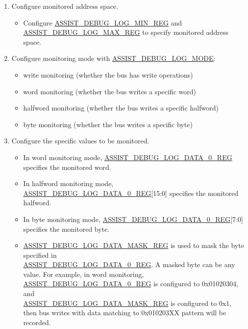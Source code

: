 \documentclass[main\_\_EN.tex]{subfiles}
\begin{document}
\begin{enumerate}

\item Configure monitored address space.
      \begin{itemize}
         \item Configure \hyperref[regdesc:ASSISTDEBUGLOGMINREG]{ASSIST\_DEBUG\_LOG\_MIN\_REG} and \hyperref[regdesc:ASSISTDEBUGLOGMAXREG]{ASSIST\_DEBUG\_LOG\_MAX\_REG} to specify monitored address space.
      \end{itemize}

\item Configure monitoring mode with \hyperref[fielddesc:ASSISTDEBUGLOGMODE]{ASSIST\_DEBUG\_LOG\_MODE}:
       \begin{itemize}
          \item write monitoring (whether the bus has write operations)
           \item word monitoring (whether the bus writes a specific word)
           \item halfword monitoring (whether the bus writes a specific halfword)
           \item byte monitoring (whether the bus writes a specific byte)
       \end{itemize}
       
\item Configure the specific values to be monitored.
       \begin{itemize}
            \item In word monitoring mode, \hyperref[regdesc:ASSISTDEBUGLOGDATA0REG]{ASSIST\_DEBUG\_LOG\_DATA\_0\_REG} specifies the monitored word.
            \item In halfword monitoring mode, \hyperref[regdesc:ASSISTDEBUGLOGDATA0REG]{ASSIST\_DEBUG\_LOG\_DATA\_0\_REG}[15:0] specifies the monitored halfword.
            \item In byte monitoring mode, \hyperref[regdesc:ASSISTDEBUGLOGDATA0REG]{ASSIST\_DEBUG\_LOG\_DATA\_0\_REG}[7:0] specifies the monitored byte.
            \item \hyperref[regdesc:ASSISTDEBUGLOGDATAMASKREG]{ASSIST\_DEBUG\_LOG\_DATA\_MASK\_REG} is used to mask the byte specified in\\ \hyperref[regdesc:ASSISTDEBUGLOGDATA0REG]{ASSIST\_DEBUG\_LOG\_DATA\_0\_REG}. A masked byte can be any value. For example, in word monitoring, \hyperref[regdesc:ASSISTDEBUGLOGDATA0REG]{ASSIST\_DEBUG\_LOG\_DATA\_0\_REG} is configured to 0x01020304, and\\ \hyperref[regdesc:ASSISTDEBUGLOGDATAMASKREG]{ASSIST\_DEBUG\_LOG\_DATA\_MASK\_REG} is configured to 0x1, then bus writes with data matching to 0x010203XX pattern will be recorded.
       \end{itemize}
       

\end{enumerate}
\end{document}
